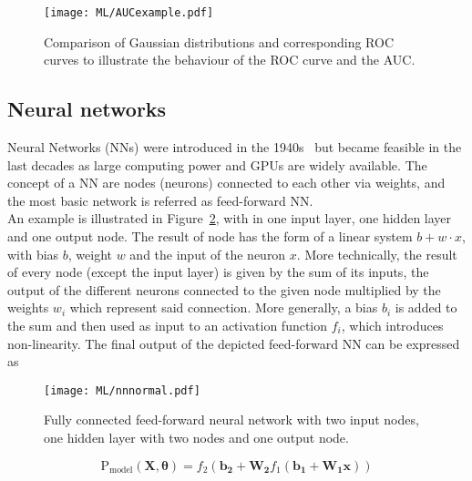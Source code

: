 \begin{figure}[htbp]
    \RawFloats
    \begin{center}
    \texttt{[image: ML/AUCexample.pdf]}
    \caption{
        Comparison of Gaussian distributions and corresponding ROC curves to illustrate the behaviour of the ROC curve and the AUC.
    }
    \label{ML:AUC}
    \end{center}
\end{figure}

\subsection{Neural networks}
\label{ML:SectionNN}
Neural Networks (NNs) were introduced in the 1940s~\cite{McCulloch1943} but became feasible in the last decades as large computing power and GPUs are widely available. The concept of a NN are nodes (neurons) connected to each other via weights, and the most basic network is referred as feed-forward NN.\\

An example is illustrated in Figure~\ref{ML:normalNN}, with in one input layer, one hidden layer and one output node. The result of node has the form of a linear system $b+w\cdot x$, with bias $b$, weight $w$ and the input of the neuron $x$. More technically, the result of every node (except the input layer) is given by the sum of its inputs, the output of the different neurons connected to the given node multiplied by the weights $w_i$ which represent said connection. More generally, a bias $b_i$ is added to the sum and then used as input to an activation function $f_i$, which introduces non-linearity. The final output of the depicted feed-forward NN can be expressed as

\begin{figure}[htbp]
    \RawFloats
    \begin{center}
    \texttt{[image: ML/nnnormal.pdf]}
    \caption{
        Fully connected feed-forward neural network with two input nodes, one hidden layer with two nodes and one output node.
    }
    \label{ML:normalNN}
    \end{center}
\end{figure}

\begin{equation}
    \text{P}_\text{model}(\mathbf{X},\boldsymbol{\theta}) = f_2(\mathbf{b_2}+\mathbf{W_2}f_1(\mathbf{b_1}+\mathbf{W_1}\mathbf{x}))
\end{equation}

